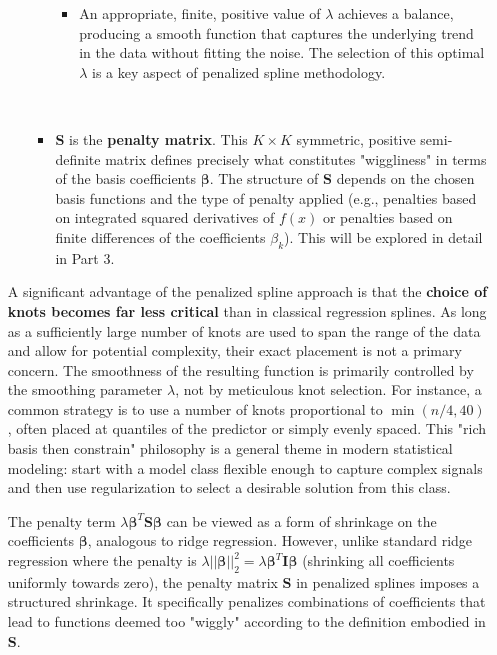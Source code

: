 \documentclass[11pt, a4paper]{article}
\begin{document}
\begin{itemize}
\begin{enumerate}
\begin{itemize}
\begin{itemize}
\item An appropriate, finite, positive value of $\lambda$ achieves a balance, producing a smooth function that captures the underlying trend in the data without fitting the noise. The selection of this optimal $\lambda$ is a key aspect of penalized spline methodology.
  \end{itemize}
  \item $\mathbf{S}$ is the \textbf{penalty matrix}. This $K \times K$ symmetric, positive semi-definite matrix defines precisely what constitutes "wiggliness" in terms of the basis coefficients $\boldsymbol{\beta}$. The structure of $\mathbf{S}$ depends on the chosen basis functions and the type of penalty applied (e.g., penalties based on integrated squared derivatives of $f(x)$ or penalties based on finite differences of the coefficients $\beta_k$). This will be explored in detail in Part 3.
 \end{itemize}
\end{enumerate}
A significant advantage of the penalized spline approach is that the \textbf{choice of knots becomes far less critical} than in classical regression splines. As long as a sufficiently large number of knots are used to span the range of the data and allow for potential complexity, their exact placement is not a primary concern. The smoothness of the resulting function is primarily controlled by the smoothing parameter $\lambda$, not by meticulous knot selection. For instance, a common strategy is to use a number of knots proportional to $\min(n/4, 40)$, often placed at quantiles of the predictor or simply evenly spaced. This "rich basis then constrain" philosophy is a general theme in modern statistical modeling: start with a model class flexible enough to capture complex signals and then use regularization to select a desirable solution from this class.

The penalty term $\lambda \boldsymbol{\beta}^T \mathbf{S} \boldsymbol{\beta}$ can be viewed as a form of shrinkage on the coefficients $\boldsymbol{\beta}$, analogous to ridge regression. However, unlike standard ridge regression where the penalty is $\lambda ||\boldsymbol{\beta}||_2^2 = \lambda \boldsymbol{\beta}^T \mathbf{I} \boldsymbol{\beta}$ (shrinking all coefficients uniformly towards zero), the penalty matrix $\mathbf{S}$ in penalized splines imposes a structured shrinkage. It specifically penalizes combinations of coefficients that lead to functions deemed too "wiggly" according to the definition embodied in $\mathbf{S}$.


\end{itemize}
\end{document}
